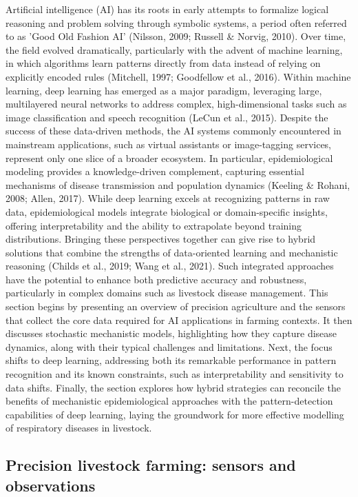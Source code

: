 Artificial intelligence (AI) has its roots in early attempts to formalize logical reasoning and problem solving through symbolic systems, a period often referred to as 'Good Old Fashion AI' (Nilsson, 2009; Russell \& Norvig, 2010). Over time, the field evolved dramatically, particularly with the advent of machine learning, in which algorithms learn patterns directly from data instead of relying on explicitly encoded rules (Mitchell, 1997; Goodfellow et al., 2016). Within machine learning, deep learning has emerged as a major paradigm, leveraging large, multilayered neural networks to address complex, high-dimensional tasks such as image classification and speech recognition (LeCun et al., 2015).
Despite the success of these data-driven methods, the AI systems commonly encountered in mainstream applications, such as virtual assistants or image-tagging services, represent only one slice of a broader ecosystem. In particular, epidemiological modeling provides a knowledge-driven complement, capturing essential mechanisms of disease transmission and population dynamics (Keeling \& Rohani, 2008; Allen, 2017). While deep learning excels at recognizing patterns in raw data, epidemiological models integrate biological or domain-specific insights, offering interpretability and the ability to extrapolate beyond training distributions.
Bringing these perspectives together can give rise to hybrid solutions that combine the strengths of data-oriented learning and mechanistic reasoning (Childs et al., 2019; Wang et al., 2021). Such integrated approaches have the potential to enhance both predictive accuracy and robustness, particularly in complex domains such as livestock disease management.
This section begins by presenting an overview of precision agriculture and the sensors that collect the core data required for AI applications in farming contexts. It then discusses stochastic mechanistic models, highlighting how they capture disease dynamics, along with their typical challenges and limitations. Next, the focus shifts to deep learning, addressing both its remarkable performance in pattern recognition and its known constraints, such as interpretability and sensitivity to data shifts. Finally, the section explores how hybrid strategies can reconcile the benefits of mechanistic epidemiological approaches with the pattern-detection capabilities of deep learning, laying the groundwork for more effective modelling of respiratory diseases in livestock.

\subsection{Precision livestock farming: sensors and observations}


